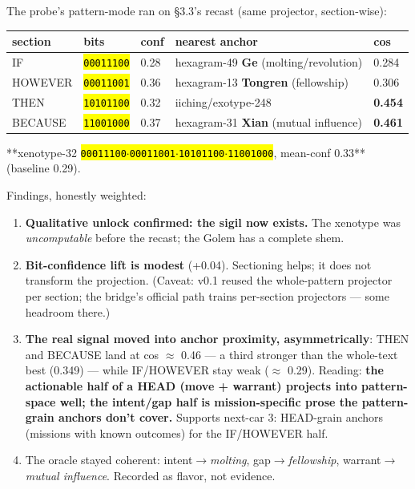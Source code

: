 \documentclass[11pt,oneside]{article}
\newcommand{\scopehl}[1]{\texttt{\hl{#1}}}
\begin{document}
\begin{subbox}[title={3.3.1 v0.1 RESULT --- the Golemization run (2026-06-10)}]

The probe's pattern-mode ran on \S{}3.3's recast (same projector, section-wise):

\begin{center}\small\begin{tabularx}{\textwidth}{YYYYY}
\toprule
section & bits & conf & nearest anchor & cos \\
\midrule
IF & \scopehl{00011100} & 0.28 & hexagram-49 \textbf{Ge } (molting/revolution) & 0.284 \\
HOWEVER & \scopehl{00011001} & 0.36 & hexagram-13 \textbf{Tongren } (fellowship) & 0.306 \\
THEN & \scopehl{10101100} & 0.32 & iiching/exotype-248 & \textbf{0.454} \\
BECAUSE & \scopehl{11001000} & 0.37 & hexagram-31 \textbf{Xian } (mutual influence) & \textbf{0.461} \\
\bottomrule
\end{tabularx}\end{center}

**xenotype-32 \scopehl{00011100$\cdot$00011001$\cdot$10101100$\cdot$11001000}, mean-conf 0.33** (baseline 0.29).

Findings, honestly weighted:
\begin{enumerate}[leftmargin=1.4em,itemsep=1pt]
\item \textbf{Qualitative unlock confirmed: the sigil now exists.} The xenotype was \emph{uncomputable} before the recast; the Golem has a complete shem.
\item \textbf{Bit-confidence lift is modest} (+0.04). Sectioning helps; it does not transform the projection. (Caveat: v0.1 reused the whole-pattern projector per section; the bridge's official path trains per-section projectors --- some headroom there.)
\item \textbf{The real signal moved into anchor proximity, asymmetrically}: THEN and BECAUSE land at cos $\approx$ 0.46 --- a third stronger than the whole-text best (0.349) --- while IF/HOWEVER stay weak ($\approx$ 0.29). Reading: \textbf{the actionable half of a HEAD (move + warrant) projects into pattern-space well; the intent/gap half is mission-specific prose the pattern-grain anchors don't cover.} Supports next-car 3: HEAD-grain anchors (missions with known outcomes) for the IF/HOWEVER half.
\item The oracle stayed coherent: intent$\rightarrow$\emph{molting}, gap$\rightarrow$\emph{fellowship}, warrant$\rightarrow$\emph{mutual influence}. Recorded as flavor, not evidence.
\end{enumerate}

\end{subbox}
\end{document}
